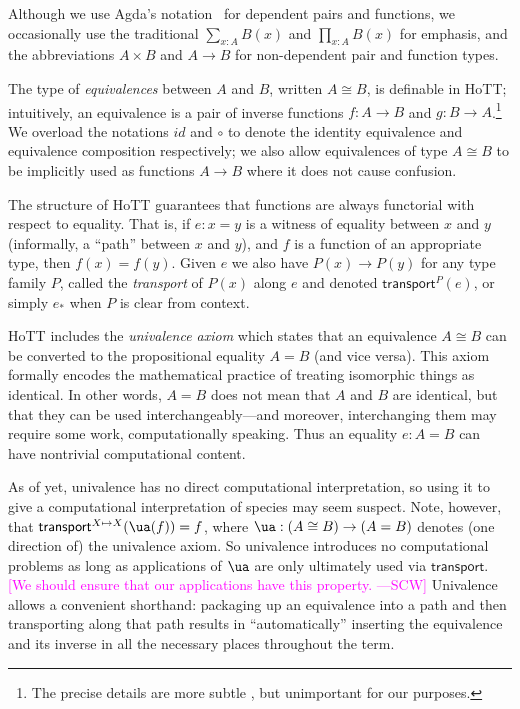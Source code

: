 \documentclass[preprint,authoryear]{sigplanconf}
\newcommand{\authornote}[3]{\textcolor{#1}{[#3 ---#2]}}
\newcommand{\authornote}[3]{}
\newcommand{\scw}[1]{\authornote{magenta}{SCW}{#1}}
\newcommand{\term}[1]{\emph{#1}}
\newcommand{\bbb}[1]{\ensuremath{\mathbb{#1}}\xspace}
\providecommand{\N}{\bbb{N}}
\newcommand{\comp}{\mathbin{\circ}}
\newcommand{\iso}{\cong}              %
\theoremstyle{definition}
\theoremstyle{remark}
\newcommand{\Type}{\ensuremath{\mathcal{U}}}
\newcommand{\transport}[2]{\ensuremath{\mathsf{transport}^{#1}(#2)}}
\newcommand{\id}{\ensuremath{\mathit{id}}}
\providecommand{\comp}{\circ}
\begin{document}
Although we use Agda's notation~\cite{Agda} for dependent pairs and
functions, we occasionally use the traditional $\sum_{x : A} B(x)$ and
$\prod_{x:A} B(x)$ for emphasis, and the
abbreviations $A \times B$ and $A \to B$ for non-dependent pair and
function types.

The type of \term{equivalences} between $A$ and $B$, written $A \iso B$, is
definable in HoTT; intuitively, an equivalence is a pair of inverse
functions $f : A \to B$ and $g : B \to A$.\footnote{The precise details are
  more subtle \cite[chap.  4]{hottbook}, but unimportant for our purposes.}
We overload the notations $\id$ and $\comp$ to denote the identity equivalence
and equivalence composition respectively; we also allow equivalences of type
$A \iso B$ to be implicitly used as functions $A \to B$ where it does not
cause confusion.

The structure of HoTT guarantees that functions are always functorial with
respect to equality. That is, if $e : x = y$ is a witness of equality between
$x$ and $y$ (informally, a ``path'' between $x$ and $y$), and $f$ is a
function of an appropriate type, then $f(x) = f(y)$.  Given $e$ we also have
$P(x) \to P(y)$ for any type family $P$, called the \term{transport} of $P(x)$
along $e$ and denoted $\transport{P}{e}$, or simply $e_*$ when $P$ is clear
from context.

HoTT includes the \emph{univalence axiom} which states that an
equivalence $A \iso B$ can be converted to the propositional equality
$A = B$ (and vice versa).  This axiom formally encodes
the mathematical practice of treating isomorphic things as
identical.  In other words, $A = B$ does not mean that $A$ and $B$ are
identical, but that they can be used interchangeably---and moreover,
interchanging them may require some work, computationally speaking.
Thus an equality $e : A = B$ can have nontrivial computational
content.

As of yet, univalence has no direct computational interpretation, so
using it to give a computational interpretation of species may seem suspect. Note,
however, that \mbox{$\transport{X \mapsto X}{\ua(f)} = f$}, where $\ua : (A
\iso B) \to (A = B)$ denotes (one direction of) the univalence
axiom. So univalence introduces no computational problems as long as
applications of $\ua$ are only ultimately used via
$\mathsf{transport}$. \scw{We should ensure that our applications have
  this property.}  Univalence allows a
convenient shorthand: packaging up an equivalence into a path
and then transporting along that path results in ``automatically''
inserting the equivalence and its inverse in all the necessary places
throughout the term.
\end{document}
